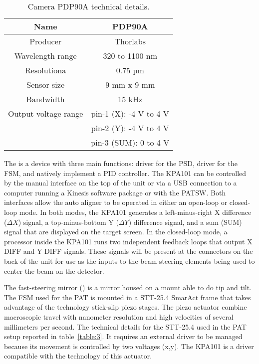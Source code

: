 \begin{table}[h!]
      \centering
      \begin{tabular}{ |c|c| }
            \hline
            Name                 & PDP90A                 \\\hline
            Producer             & Thorlabs               \\\hline
            Wavelength range     & 320 to 1100 nm         \\\hline
            Resolutiona          & 0.75 µm                \\\hline
            Sensor size          & 9 mm x 9 mm            \\\hline
            Bandwidth            & 15 kHz                 \\\hline
            Output voltage range & pin-1 (X): -4 V to 4 V \\
                                 & pin-2 (Y): -4 V to 4 V \\
                                 & pin-3 (SUM): 0 to 4 V  \\\hline
      \end{tabular}
      \caption{Camera PDP90A technical details.}
      \label{table:2}
\end{table}

The  is a device with three main functions: driver for the PSD, driver for the FSM, and natively implement a PID controller.
The KPA101 can be controlled by the manual interface on the top of the unit or via a USB connection to a computer running a Kinesis software package or with the PATSW. Both interfaces allow the auto aligner to be operated in either an open-loop or closed-loop mode. In both modes, the KPA101 generates a left-minus-right X difference ($\Delta X$) signal, a top-minus-bottom Y ($\Delta Y$) difference signal, and a sum (SUM) signal that are displayed on the target screen. In the closed-loop mode, a processor inside the KPA101 runs two independent feedback loops that output X DIFF and Y DIFF signals. These signals will be present at the connectors on the back of the unit for use as the inputs to the beam steering elements being used to center the beam on the detector.

The fast-steering mirror () is a mirror housed on a mount able to do tip and tilt.
The FSM used for the PAT is mounted in a STT-25.4 SmarAct frame that takes advantage of the technology stick-slip piezo stages. The piezo actuator combine macroscopic travel with nanometer resolution and high velocities of several millimeters per second. The technical details for the STT-25.4 used in the PAT setup reported in table~\ref{table:3}.
It requires an external driver to be managed because its movement is controlled by two voltages (x,y). The KPA101 is a driver compatible with the technology of this actuator.


